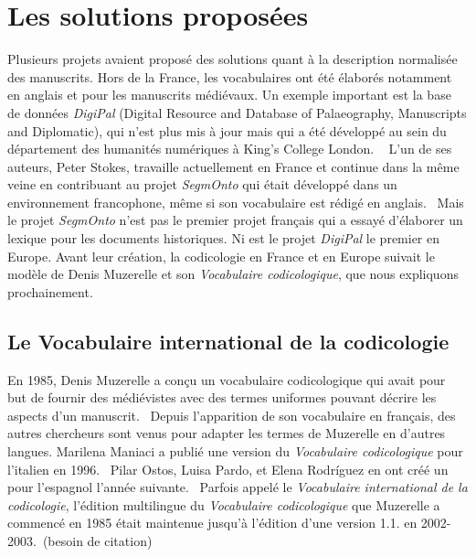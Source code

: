 \documentclass[class=article, crop=false]{standalone}
\begin{document}
\section{Les solutions proposées}

Plusieurs projets avaient proposé des solutions quant à la description normalisée des manuscrits. Hors de la France, les vocabulaires ont été élaborés notamment en anglais et pour les manuscrits médiévaux. Un exemple important est la base de données \textit{DigiPal} (Digital Resource and Database of Palaeography, Manuscripts and Diplomatic), qui n'est plus mis à jour mais qui a été développé au sein du département des humanités numériques à King's College London. ~\autocite{DigiPalDigitalResource2011} L'un de ses auteurs, Peter Stokes, travaille actuellement en France et continue dans la même veine en contribuant au projet \textit{SegmOnto} qui était développé dans un environnement francophone, même si son vocabulaire est rédigé en anglais.~\autocite{gabaySegmOnto2021} Mais le projet \textit{SegmOnto} n'est pas le premier projet français qui a essayé d'élaborer un lexique pour les documents historiques. Ni est le projet \textit{DigiPal} le premier en Europe. Avant leur création, la codicologie en France et en Europe suivait le modèle de Denis Muzerelle et son \textit{Vocabulaire codicologique}, que nous expliquons prochainement.

\subsection{Le Vocabulaire international de la codicologie}

En 1985, Denis Muzerelle a conçu un vocabulaire codicologique qui avait pour but de fournir des médiévistes avec des termes uniformes pouvant décrire les aspects d'un manuscrit.~\autocite{muzerelleVocabulaireCodicologiqueRepertoire1985} Depuis l'apparition de son vocabulaire en français, des autres chercheurs sont venus pour adapter les termes de Muzerelle en d'autres langues. Marilena Maniaci a publié une version du \textit{Vocabulaire codicologique} pour l'italien en 1996.~\autocite{maniaciTerminologiaLibroManoscritto1996} Pilar Ostos, Luisa Pardo, et Elena Rodríguez en ont créé un pour l'espagnol l'année suivante.~\autocite{ostosVocabularioCodicologIaVersion1997} Parfois appelé le \textit{Vocabulaire international de la codicologie}, l'édition multilingue du \textit{Vocabulaire codicologique} que Muzerelle a commencé en 1985 était maintenue jusqu'à l'édition d'une version 1.1. en 2002-2003.~(besoin de citation)
\end{document}
